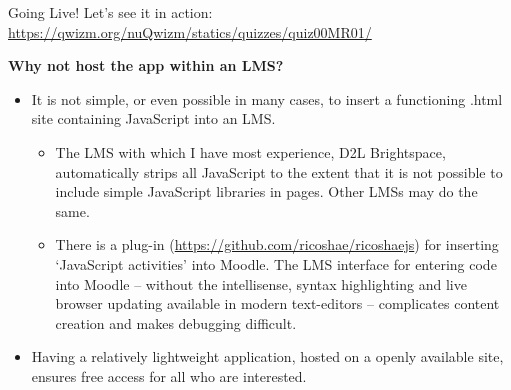 \documentclass[11pt,xcolor={svgnames, x11names}]{beamer}
\begin{document}


\begin{frame}{Going Live!}
	Let's see it in action: \lb
	\url{https://qwizm.org/nuQwizm/statics/quizzes/quiz00MR01/}
\end{frame}



\begin{frame}{\bf Why not host the app within an LMS?}
	\begin{itemize}
		\item It is not simple, or even possible in many cases, to insert a functioning .html site containing JavaScript into an LMS. 
		\begin{itemize}
			\item The LMS with which I have most experience, D2L Brightspace, automatically strips all JavaScript to the extent that it is not possible to include simple JavaScript libraries in pages. Other LMSs may do the same.\pars
			\item There is a plug-in ({\scriptsize\url{https://github.com/ricoshae/ricoshaejs}}) for inserting `JavaScript activities' into Moodle. The LMS interface for entering code into Moodle -- without the intellisense, syntax highlighting and live browser updating available in modern text-editors -- complicates content creation and makes debugging difficult.
		\end{itemize}
		\item Having a relatively lightweight application, hosted on a openly available site, ensures free access for all who are interested.
		
	\end{itemize}

\end{frame}	
\end{document}
